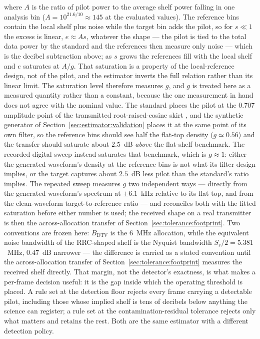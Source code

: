 where $A$ is the ratio of pilot power to the average shelf power falling in one analysis bin ($A = 10^{21.6/10} \approx 145$ at the evaluated values). The reference bins contain the local shelf plus noise while the target bin adds the pilot, so for $s \ll 1$ the excess is linear, $e \approx A s$, whatever the shape --- the pilot is tied to the total data power by the standard and the references then measure only noise --- which is the decibel subtraction above; as $s$ grows the references fill with the local shelf and $e$ saturates at $A/g$. That saturation is a property of the local-reference design, not of the pilot, and the estimator inverts the full relation rather than its linear limit. The saturation level therefore measures $g$, and $g$ is treated here as a measured quantity rather than a constant, because the one measurement in hand does not agree with the nominal value. The standard places the pilot at the $0.707$ amplitude point of the transmitted root-raised-cosine skirt \cite{atsc-a53-part2}, and the synthetic generator of Section~\ref{sec:estimator:validation} places it at the same point of its own filter, so the reference bins should see half the flat-top density ($g \simeq 0.56$) and the transfer should saturate about $2.5$~dB \emph{above} the flat-shelf benchmark. The recorded digital sweep instead saturates  that benchmark, which is $g \approx 1$: either the generated waveform's density at the reference bins is not what its filter design implies, or the target captures about $2.5$~dB less pilot than the standard's ratio implies. The repeated sweep measures $g$ two independent ways --- directly from the generated waveform's spectrum at $\pm 6.1$~kHz relative to its flat top, and from the clean-waveform target-to-reference ratio --- and reconciles both with the fitted saturation before either number is used; the received shape on a real transmitter is then the across-allocation transfer of Section~\ref{sec:tolerance:footprint}. Two conventions are frozen here: $B_{\text{DTV}}$ is the $6$~MHz allocation, while the equivalent noise bandwidth of the RRC-shaped shelf is the Nyquist bandwidth $S_r/2 = 5.381$~MHz, $0.47$~dB narrower --- the difference is carried as a stated convention until the across-allocation transfer of Section~\ref{sec:tolerance:footprint} measures the received shelf directly. That margin, not the detector's exactness, is what makes a per-frame decision useful: it is the gap inside which the operating threshold is placed. A rule set at the detection floor rejects every frame carrying a detectable pilot, including those whose implied shelf is tens of decibels below anything the science can register; a rule set at the contamination-residual tolerance rejects only what matters and retains the rest. Both are the same estimator with a different detection policy.

